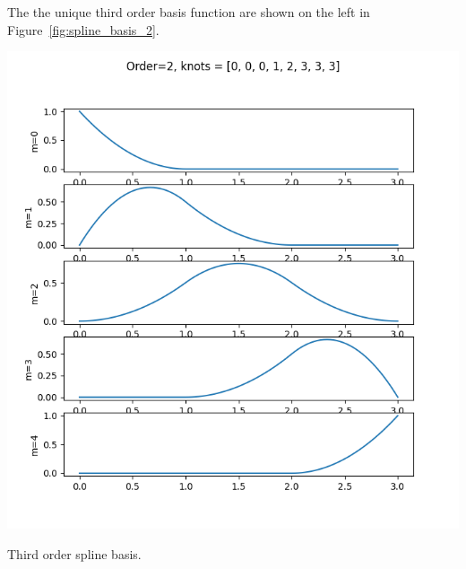 The the unique third order basis function are shown on the left in Figure~\ref{fig:spline_basis_2}.
\begin{marginfigure}[-8in]
  	\includegraphics[width=\linewidth]{./chap5_trajectory_planning/figures/spline_basis_2}
  \caption{Third order spline basis.}
  \label{fig:spline_basis_2}  
\end{marginfigure}
